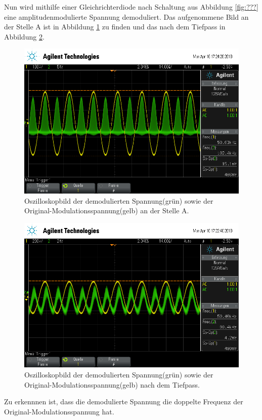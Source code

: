 Nun wird mithilfe einer Gleichrichterdiode nach Schaltung aus Abbildung \ref{fig:???} eine amplitudenmodulierte Spannung demoduliert.
Das aufgenommene Bild an der Stelle A ist in Abbildung \ref{fig:gnachA} zu finden und das nach dem Tiefpass in Abbildung \ref{fig:gnachTiefpass}.
\begin{figure}[h]
  \centering
  \includegraphics[width=.9\textwidth]{Oszi_Pics/gnachA.png}
  \caption{Oszilloskopbild der demodulierten Spannung(grün) sowie der Original-Modulationsspannung(gelb) an der Stelle A.}
  \label{fig:gnachA}
\end{figure}
\begin{figure}[h]
  \centering
  \includegraphics[width=.9\textwidth]{Oszi_Pics/gnachTiefpass.png}
  \caption{Oszilloskopbild der demodulierten Spannung(grün) sowie der Original-Modulationsspannung(gelb) nach dem Tiefpass.}
  \label{fig:gnachTiefpass}
\end{figure}
Zu erkennnen ist, dass die demodulierte Spannung die doppelte Frequenz der Original-Modulationsspannung hat.

